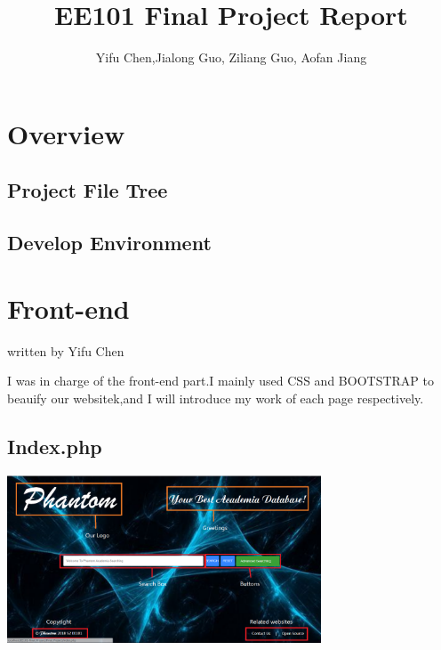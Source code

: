 \documentclass[10pt,twoside,a4paper,titlepage]{article}
\title{EE101 Final Project Report}
\author{Yifu Chen,Jialong Guo, Ziliang Guo, Aofan Jiang}
\begin{document}
\maketitle
\phantom{s}
\thispagestyle{empty}
\clearpage

\tableofcontents
\thispagestyle{empty}
\newpage
\setcounter{page}{1}

\section{Overview}
\subsection{Project File Tree}

\subsection{Develop Environment}




	\section{Front-end}
	written by Yifu Chen
		
		I was in charge of the front-end part.I mainly used CSS and BOOTSTRAP to beauify our websitek,and I will introduce my work  of each page respectively.
		
		\subsection{Index.php}
		
		\includegraphics[width=0.7\textwidth]{cyf/index_structure.PNG}
		
\end{document}
